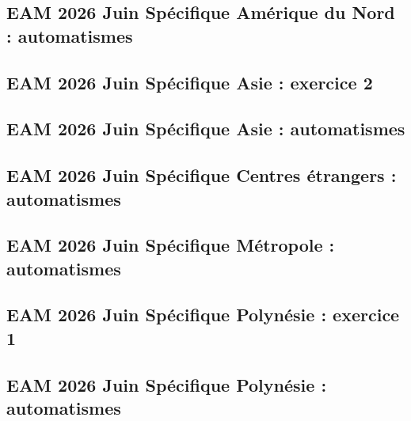 \documentclass[lang=fr,edition=teacher,layout=sheet]{mxbook}
\begin{document}
\subsection*{EAM 2026 Juin Spécifique Amérique du Nord : automatismes}
\begingroup\endgroup
\par\bigskip
{}\subsection*{EAM 2026 Juin Spécifique Asie : exercice 2}
\begingroup\endgroup
\par\bigskip
{}\subsection*{EAM 2026 Juin Spécifique Asie : automatismes}
\begingroup\endgroup
\par\bigskip
{}\subsection*{EAM 2026 Juin Spécifique Centres étrangers : automatismes}
\begingroup\endgroup
\par\bigskip
{}\subsection*{EAM 2026 Juin Spécifique Métropole : automatismes}
\begingroup\endgroup
\par\bigskip
{}\subsection*{EAM 2026 Juin Spécifique Polynésie : exercice 1}
\begingroup\endgroup
\par\bigskip
{}\subsection*{EAM 2026 Juin Spécifique Polynésie : automatismes}
\end{document}
